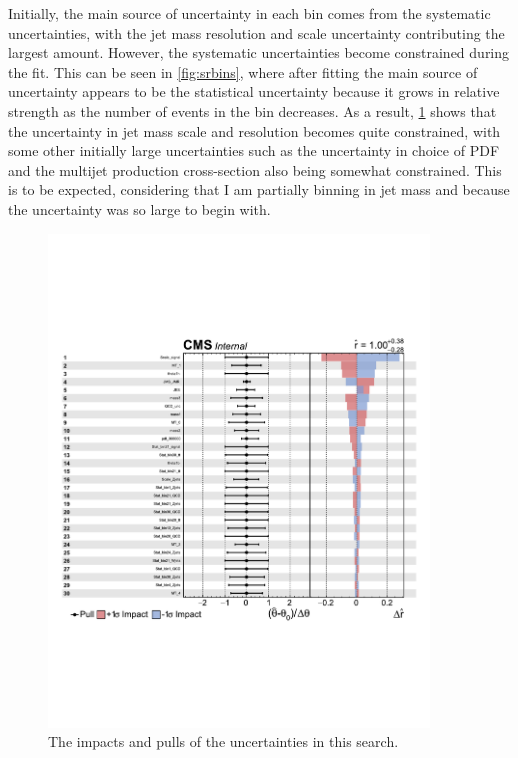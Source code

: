 

Initially, the main source of uncertainty in each bin comes from the systematic uncertainties, with the jet mass resolution and scale uncertainty contributing the largest amount. However, the systematic uncertainties become constrained during the fit. This can be seen in \cref{fig:srbins}, where after fitting the main source of uncertainty appears to be the statistical uncertainty because it grows in relative strength as the number of events in the bin decreases. As a result, \cref{fig:impacts} shows that the uncertainty in jet mass scale and resolution becomes quite constrained, with some other initially large uncertainties such as the uncertainty in choice of PDF and the multijet production cross-section also being somewhat constrained. This is to be expected, considering that I am partially binning in jet mass and because the uncertainty was so large to begin with.

\begin{figure}[ht]
    \centering
    \includegraphics[width=0.9\textwidth]{Chapters/Systematics/impacts_both_sidebands_pg1.pdf}
    \caption{The impacts and pulls of the uncertainties in this search.}
    \label{fig:impacts}
\end{figure}